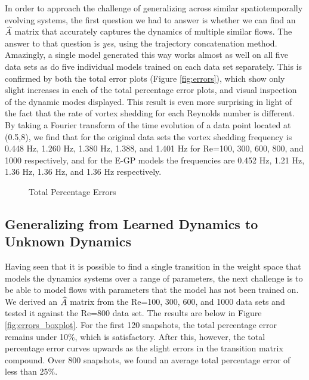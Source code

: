 In order to approach the challenge of generalizing across similar spatiotemporally evolving systems, the first question we had to answer is whether we can find an $\widehat{A}$ matrix that accurately captures the dynamics of multiple similar flows. The answer to that question is \textit{yes}, using the trajectory concatenation method. Amazingly, a single model generated this way works almost as well on all five data sets as do five individual models trained on each data set separately. This is confirmed by both the total error plots (Figure \ref{fig:errors}), which show only slight increases in each of the total percentage error plots, and visual inspection of the dynamic modes displayed. This result is even more surprising in light of the fact that the rate of vortex shedding for each Reynolds number is different. By taking a Fourier transform of the time evolution of a data point located at (0.5,8), we find that for the original data sets the vortex shedding frequency is 0.448 Hz, 1.260 Hz, 1.380 Hz, 1.388, and 1.401 Hz for Re=100, 300, 600, 800, and 1000 respectively, and for the E-GP models the frequencies are 0.452 Hz, 1.21 Hz, 1.36 Hz, 1.36 Hz, and 1.36 Hz respectively.

\begin{figure*}[h] %
	\centering
	\caption{Total Percentage Errors}
\end{figure*}

\subsection{Generalizing from Learned Dynamics to Unknown Dynamics}\label{sec:generalize}

Having seen that it is possible to find a single transition in the weight space that models the dynamics systems over a range of parameters, the next challenge is to be able to model flows with parameters that the model has not been trained on. We derived an $\widehat{A}$ matrix from the Re=100, 300, 600, and 1000 data sets and tested it against the Re=800 data set. The results are below in Figure \ref{fig:errors_boxplot}. For the first 120 snapshots, the total percentage error remains under 10\%, which is satisfactory. After this, however, the total percentage error curves upwards as the slight errors in the transition matrix compound. Over 800 snapshots, we found an average total percentage error of less than 25\%. %

